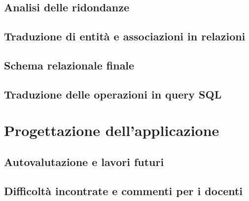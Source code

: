 \documentclass[a4paper,12pt]{report}
\begin{document}
\section{Analisi delle ridondanze}
\section{Traduzione di entità e associazioni in relazioni}
\section{Schema relazionale finale}
\section{Traduzione delle operazioni in query SQL}

\chapter{Progettazione dell'applicazione}
\section{Autovalutazione e lavori futuri}
\section{Difficoltà incontrate e commenti per i docenti}
\end{document}
